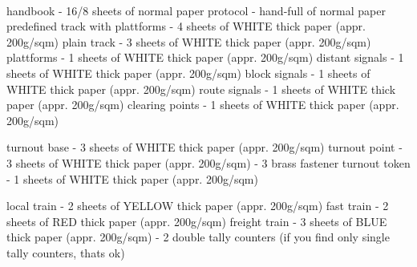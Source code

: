 \documentclass[
  paper=a4,
  version=3.25,
  pagesize=pdftex,
  twoside=false,
  DIV=12,
  headinclude=true,
  footinclude=false,
  toc=listof,
]{scrbook}
\begin{document}

  \thispagestyle{empty}
  \begin{center}
    \\
    handbook - 16/8 sheets of normal paper
    protocol - hand-full of normal paper
    predefined track with plattforms - 4 sheets of WHITE thick paper (appr. 200g/sqm)
    plain track - 3 sheets of WHITE thick paper (appr. 200g/sqm)
    plattforms - 1 sheets of WHITE thick paper (appr. 200g/sqm)
    distant signals - 1 sheets of WHITE thick paper (appr. 200g/sqm)
    block signals - 1 sheets of WHITE thick paper (appr. 200g/sqm)
    route signals - 1 sheets of WHITE thick paper (appr. 200g/sqm)
    clearing points - 1 sheets of WHITE thick paper (appr. 200g/sqm)

    turnout base - 3 sheets of WHITE thick paper (appr. 200g/sqm)
    turnout point - 3 sheets of WHITE thick paper (appr. 200g/sqm)
                  - 3 brass fastener
    turnout token - 1 sheets of WHITE thick paper (appr. 200g/sqm)


    local train - 2 sheets of YELLOW thick paper (appr. 200g/sqm)
    fast train - 2 sheets of RED thick paper (appr. 200g/sqm)
    freight train  - 3 sheets of BLUE thick paper (appr. 200g/sqm)
    - 2 double tally counters (if you find only single tally counters, thats ok)
    
    \vfil\normalsize
  \end{center}
\end{document}
